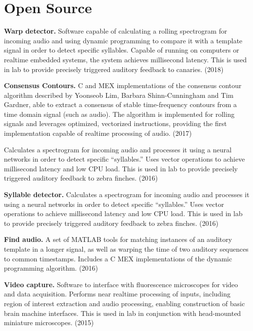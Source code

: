 \section*{Open Source}
	\textbf{Warp detector.} Software capable of calculating a rolling spectrogram for incoming audio and using dynamic programming to compare it with a template signal in order to detect specific syllables. Capable of running on computers or realtime embedded systems, the system achieves millisecond latency. This is used in lab to provide precisely triggered auditory feedback to canaries. (2018)

\bigskip

\noindent
	\textbf{Consensus Contours.} C and MEX implementations of the consensus contour algorithm described by Yoonseob Lim, Barbara Shinn-Cunningham and Tim Gardner, able to extract a consensus of stable time-frequency contours from a time domain signal (such as audio). The algorithm is implemented for rolling signals and leverages optimized, vectorized instructions, providing the first implementation capable of realtime processing of audio. (2017)

\bigskip

\noindent
	Calculates a spectrogram for incoming audio and processes it using a neural networks in order to detect specific ``syllables.'' Uses vector operations to achieve millisecond latency and low CPU load. This is used in lab to provide precisely triggered auditory feedback to zebra finches. (2016)

\bigskip

\noindent
	\textbf{Syllable detector.} Calculates a spectrogram for incoming audio and processes it using a neural networks in order to detect specific ``syllables.'' Uses vector operations to achieve millisecond latency and low CPU load. This is used in lab to provide precisely triggered auditory feedback to zebra finches. (2016)

\bigskip

\noindent
	\textbf{Find audio.} A set of MATLAB tools for matching instances of an auditory template in a longer signal, as well as warping the time of two auditory sequences to common timestamps. Includes a C MEX implementations of the dynamic programming algorithm. (2016)

\bigskip

\noindent
	\textbf{Video capture.} Software to interface with fluorescence microscopes for video and data acquisition. Performs near realtime processing of inputs, including region of interest extraction and audio processing, enabling construction of basic brain machine interfaces. This is used in lab in conjunction with head-mounted miniature microscopes. (2015)

